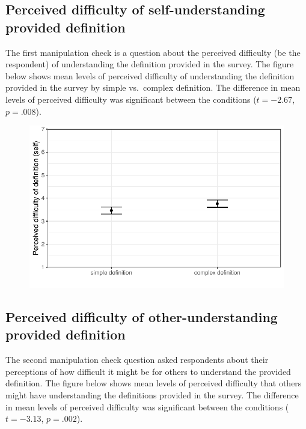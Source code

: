 \documentclass[
]{article}
\begin{document}
\hypertarget{perceived-difficulty-of-self-understanding-provided-definition}{%
\subsection{Perceived difficulty of self-understanding provided
definition}\label{perceived-difficulty-of-self-understanding-provided-definition}}

The first manipulation check is a question about the perceived
difficulty (be the respondent) of understanding the definition provided
in the survey. The figure below shows mean levels of perceived
difficulty of understanding the definition provided in the survey by
simple vs.~complex definition. The difference in mean levels of
perceived difficulty was significant between the conditions
(\(t = -2.67\), \(p = .008\)).

\begin{figure}

{\centering \includegraphics{BioMADE-fall2025-data-analysis_files/figure-pdf/defn-MC-self-1.pdf}

}

\end{figure}

\hypertarget{perceived-difficulty-of-other-understanding-provided-definition}{%
\subsection{Perceived difficulty of other-understanding provided
definition}\label{perceived-difficulty-of-other-understanding-provided-definition}}

The second manipulation check question asked respondents about their
perceptions of how difficult it might be for others to understand the
provided definition. The figure below shows mean levels of perceived
difficulty that others might have understanding the definitions provided
in the survey. The difference in mean levels of perceived difficulty was
significant between the conditions (\(t = -3.13\), \(p = .002\)).
\end{document}
